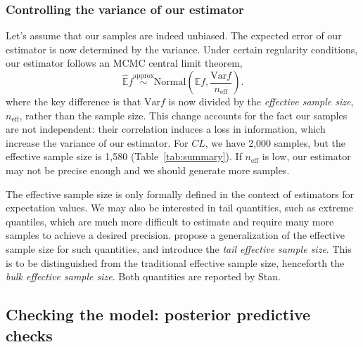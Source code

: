 \subsubsection{Controlling the variance of our estimator}

Let's assume that our samples are indeed unbiased.
The expected error of our estimator is now determined by the variance.
Under certain regularity conditions, our estimator follows an MCMC central limit theorem,
\begin{equation*}
  \hat {\mathbb E} f \overset{\mathrm{approx}}{\sim} \mathrm{Normal} \left ( \mathbb E f, \frac{\mathrm{Var} f}{n_\mathrm{eff}} \right ).
\end{equation*}
where the key difference is that $\mathrm{Var} f$ is now divided by the \textit{effective sample size}, $n_\mathrm{eff}$, rather than the sample size.
This change accounts for the fact our samples are not independent: their correlation induces a loss in information, which increase the variance of our estimator.
For $CL$, we have 2,000 samples, but the effective sample size is 1,580 (Table~\ref{tab:summary}).
If $n_\mathrm{eff}$ is low, our estimator may not be precise enough and we should generate more samples.

The effective sample size is only formally defined in the context of estimators for expectation values.
We may also be interested in tail quantities, such as extreme quantiles, which are much more difficult to estimate and require many more samples to achieve a desired precision.
\citet{Vehtari:2020} propose a generalization of the effective sample size for such quantities, and introduce the \textit{tail effective sample size}.
This is to be distinguished from the traditional effective sample size, henceforth the \textit{bulk effective sample size}.
Both quantities are reported by Stan.

\subsection{Checking the model: posterior predictive checks}  \label{sec:twoCpt_ppc}

